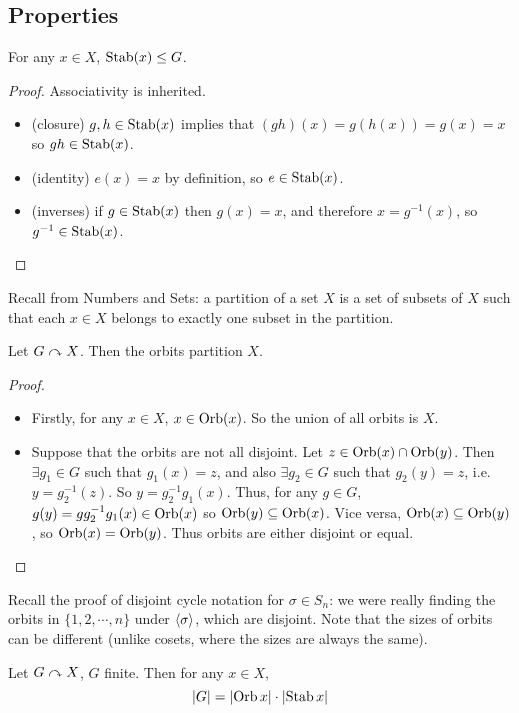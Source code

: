 \subsection{Properties}
\begin{lemma}
	For any \(x \in X\), \(\operatorname{Stab}(x) \leq G\).
\end{lemma}
\begin{proof}
	Associativity is inherited.
	\begin{itemize}
		\item (closure) \(g, h \in \operatorname{Stab}(x)\) implies that \((gh)(x) = g(h(x)) = g(x) = x\) so \(gh \in \operatorname{Stab}(x)\).
		\item (identity) \(e(x) = x\) by definition, so \(e \in \operatorname{Stab}(x)\).
		\item (inverses) if \(g \in \operatorname{Stab}(x)\) then \(g(x) = x\), and therefore \(x = g^{-1}(x)\), so \(g^{-1} \in \operatorname{Stab}(x)\).
	\end{itemize}
\end{proof}
Recall from Numbers and Sets: a partition of a set \(X\) is a set of subsets of \(X\) such that each \(x \in X\) belongs to exactly one subset in the partition.
\begin{lemma}
	Let \(G \curvearrowright X\).
	Then the orbits partition \(X\).
\end{lemma}
\begin{proof}
	\begin{itemize}
		\item Firstly, for any \(x \in X\), \(x \in \operatorname{Orb}(x)\).
		      So the union of all orbits is \(X\).
		\item Suppose that the orbits are not all disjoint.
		      Let \(z \in \operatorname{Orb}(x) \cap \operatorname{Orb}(y)\).
		      Then \(\exists g_1 \in G\) such that \(g_1(x) = z\), and also \(\exists g_2 \in G\) such that \(g_2(y) = z\), i.e.\ \(y = g_2^{-1}(z)\).
		      So \(y = g_2^{-1}g_1(x)\).
		      Thus, for any \(g \in G\), \(g(y) = gg_2^{-1}g_1(x) \in \operatorname{Orb}(x)\) so \(\operatorname{Orb}(y) \subseteq \operatorname{Orb}(x)\).
		      Vice versa, \(\operatorname{Orb}(x) \subseteq \operatorname{Orb}(y)\), so \(\operatorname{Orb}(x) = \operatorname{Orb}(y)\).
		      Thus orbits are either disjoint or equal.
	\end{itemize}
\end{proof}
Recall the proof of disjoint cycle notation for \(\sigma \in S_n\): we were really finding the orbits in \(\{ 1, 2, \cdots, n \}\) under \(\langle{} \sigma \rangle\), which are disjoint.
Note that the sizes of orbits can be different (unlike cosets, where the sizes are always the same).
\begin{theorem}
	Let \(G \curvearrowright X\), \(G\) finite.
	Then for any \(x \in X\),
	\[
		\abs{G} = \abs{\operatorname{Orb} x} \cdot \abs{\operatorname{Stab} x}
	\]
\end{theorem}
